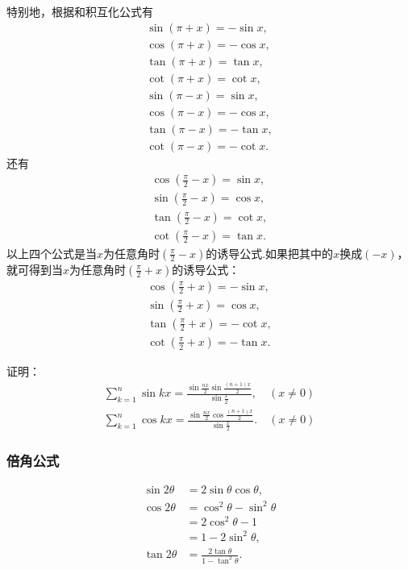 特别地，根据和积互化公式有
\begin{gather}
\sin(\pi+x) = -\sin x, \\
\cos(\pi+x) = -\cos x, \\
\tan(\pi+x) = \tan x, \\
\cot(\pi+x) = \cot x, \\
\sin(\pi-x) = \sin x, \\
\cos(\pi-x) = -\cos x, \\
\tan(\pi-x) = -\tan x, \\
\cot(\pi-x) = -\cot x.
\end{gather}
还有
\begin{gather}
\cos\left(\frac{\pi}{2}-x\right) = \sin x, \\
\sin\left(\frac{\pi}{2}-x\right) = \cos x, \\
\tan\left(\frac{\pi}{2}-x\right) = \cot x, \\
\cot\left(\frac{\pi}{2}-x\right) = \tan x.
\end{gather}
以上四个公式是当\(x\)为任意角时\(\left(\frac{\pi}{2}-x\right)\)的诱导公式.如果把其中的\(x\)换成\((-x)\)，就可得到当\(x\)为任意角时\(\left(\frac{\pi}{2}+x\right)\)的诱导公式：
\begin{gather}
\cos\left(\frac{\pi}{2}+x\right) = -\sin x, \\
\sin\left(\frac{\pi}{2}+x\right) = \cos x, \\
\tan\left(\frac{\pi}{2}+x\right) = -\cot x, \\
\cot\left(\frac{\pi}{2}+x\right) = -\tan x.
\end{gather}

\begin{example}
\def\s{\sum\limits_{k=1}^n}%
证明：\begin{gather}
\s \sin kx
= \frac{\sin\frac{nx}{2} \sin\frac{(n+1)x}{2}}{\sin\frac{x}{2}},
\quad(x\neq0) \\
\s \cos kx
= \frac{\sin\frac{nx}{2} \cos\frac{(n+1)x}{2}}{\sin\frac{x}{2}}.
\quad(x\neq0)
\end{gather}
\end{example}

\subsubsection{倍角公式}
\begin{theorem}[二倍角公式]
\begin{align}
\sin 2 \theta &= 2 \sin \theta \cos \theta, \\
\cos 2 \theta &= \cos^2 \theta - \sin^2 \theta \\
	&= 2 \cos^2 \theta - 1 \\
	&= 1 - 2 \sin^2 \theta, \\
\tan 2 \theta &= \frac{2 \tan \theta}{1 - \tan^2 \theta}.
\end{align}
\end{theorem}


